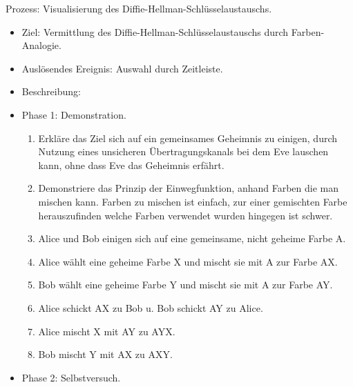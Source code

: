 \documentclass{article}
\begin{document}
\begin{FA}[start=130]
 \item Prozess: Visualisierung des Diffie-Hellman-Schlüsselaustauschs.
\end{FA}
\begin{itemize}[label={}]

 \item Ziel: Vermittlung des Diffie-Hellman-Schlüsselaustauschs durch Farben-Analogie.

 \item Auslösendes Ereignis: Auswahl durch Zeitleiste.

 \item Beschreibung:

 \item Phase 1: Demonstration.

	\begin{enumerate}[]
     \item Erkläre das Ziel sich auf ein gemeinsames Geheimnis zu einigen,
           durch Nutzung eines unsicheren Übertragungskanals
           bei dem Eve lauschen kann, ohne dass Eve das Geheimnis erfährt.
     \item Demonstriere das Prinzip der Einwegfunktion, anhand Farben die man mischen
           kann. Farben zu mischen ist einfach, zur einer gemischten Farbe
           herauszufinden welche Farben verwendet wurden hingegen ist schwer.
     \item Alice und Bob einigen sich auf eine gemeinsame, nicht geheime Farbe A.
     \item Alice wählt eine geheime Farbe X und mischt sie mit A zur Farbe AX.
     \item Bob wählt eine geheime Farbe Y und mischt sie mit A zur Farbe AY.
     \item Alice schickt AX zu Bob u. Bob schickt AY zu Alice.
     \item Alice mischt X mit AY zu AYX.
     \item Bob mischt Y mit AX zu AXY.
	\end{enumerate}

 \item Phase 2: Selbstversuch.


\end{itemize}
\end{document}
